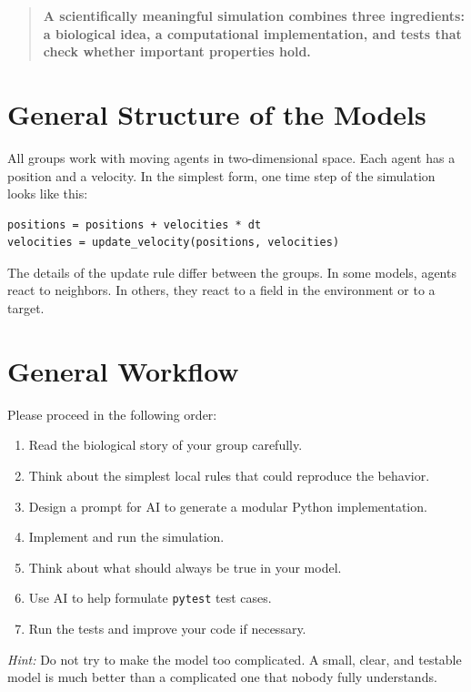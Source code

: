 \documentclass[paper=letter, fontsize=12pt]{article}
\numberwithin{equation}{section}
\begin{document}
\begin{quote}
\textbf{A scientifically meaningful simulation combines three ingredients: a biological idea, a computational implementation, and tests that check whether important properties hold.}
\end{quote}

\section*{General Structure of the Models}

All groups work with moving agents in two-dimensional space. Each agent has a position and a velocity. In the simplest form, one time step of the simulation looks like this:

\begin{lstlisting}
positions = positions + velocities * dt
velocities = update_velocity(positions, velocities)
\end{lstlisting}

The details of the update rule differ between the groups. In some models, agents react to neighbors. In others, they react to a field in the environment or to a target.

\section*{General Workflow}

Please proceed in the following order:

\begin{enumerate}[label=\arabic*.]
\item Read the biological story of your group carefully.
\item Think about the simplest local rules that could reproduce the behavior.
\item Design a prompt for AI to generate a modular Python implementation.
\item Implement and run the simulation.
\item Think about what should always be true in your model.
\item Use AI to help formulate \texttt{pytest} test cases.
\item Run the tests and improve your code if necessary.
\end{enumerate}

\emph{Hint:} Do not try to make the model too complicated. A small, clear, and testable model is much better than a complicated one that nobody fully understands.
\end{document}
